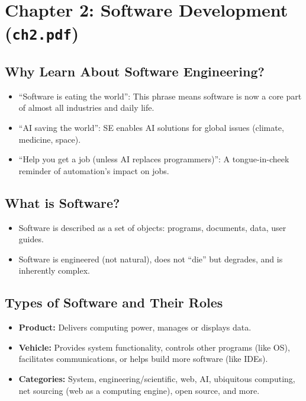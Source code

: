 \documentclass[11pt,a4paper]{article}
\begin{document}
\section{Chapter 2: Software Development (\texttt{ch2.pdf})}

\subsection*{Why Learn About Software Engineering?}
\begin{itemize}
    \item ``Software is eating the world'': This phrase means software is now a core part of almost all industries and daily life.
    \item ``AI saving the world'': SE enables AI solutions for global issues (climate, medicine, space).
    \item ``Help you get a job (unless AI replaces programmers)'': A tongue-in-cheek reminder of automation's impact on jobs.
\end{itemize}

\subsection*{What is Software?}
\begin{itemize}
    \item Software is described as a set of objects: programs, documents, data, user guides.
    \item Software is engineered (not natural), does not ``die'' but degrades, and is inherently complex.
\end{itemize}

\subsection*{Types of Software and Their Roles}
\begin{itemize}
    \item \textbf{Product:} Delivers computing power, manages or displays data.
    \item \textbf{Vehicle:} Provides system functionality, controls other programs (like OS), facilitates communications, or helps build more software (like IDEs).
    \item \textbf{Categories:} System, engineering/scientific, web, AI, ubiquitous computing, net sourcing (web as a computing engine), open source, and more.
\end{itemize}
\end{document}
